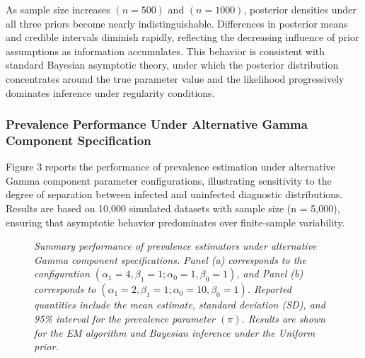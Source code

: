 \documentclass[11pt]{article}
\begin{document}
As sample size increases $(n = 500)$ and $(n = 1000)$, posterior densities under all three priors become nearly indistinguishable. Differences in posterior means and credible intervals diminish rapidly, reflecting the decreasing influence of prior assumptions as information accumulates. This behavior is consistent with standard Bayesian asymptotic theory, under which the posterior distribution concentrates around the true parameter value and the likelihood progressively dominates inference under regularity conditions.


\subsubsection*{\textbf{Prevalence Performance Under Alternative Gamma Component Specification}}

Figure 3 reports the performance of prevalence estimation under alternative Gamma component parameter configurations, illustrating sensitivity to the degree of separation between infected and uninfected diagnostic distributions. Results are based on 10,000 simulated datasets with sample size (n = 5{,}000), ensuring that asymptotic behavior predominates over finite-sample variability.



\begin{figure}[htbp]
	\caption{\em Summary performance of prevalence estimators under alternative Gamma component specifications. Panel (a) corresponds to the configuration $(\alpha_1 = 4, \beta_1 = 1; \alpha_0 = 1, \beta_0 = 1)$, and Panel (b) corresponds to $(\alpha_1 = 2, \beta_1 = 1; \alpha_0 = 10, \beta_0 = 1)$. Reported quantities include the mean estimate, standard deviation (SD), and 95\% interval for the prevalence parameter $(\pi)$. Results are shown for the EM algorithm and Bayesian inference under the Uniform prior.}
	\label{posterior3}
\end{figure}
\end{document}
